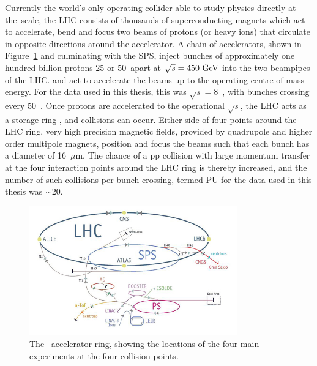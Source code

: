 Currently the world's only operating collider able to study physics directly at the~\TeV scale, the \ac{LHC} consists of thousands of superconducting magnets which act to accelerate, bend and focus two beams of protons (or heavy ions) that circulate in opposite directions around the accelerator. 
A chain of accelerators, shown in Figure~\ref{fig:LHC} and culminating with the \ac{SPS}, inject bunches of approximately one hundred billion protons 25 or 50~\ns apart at $\sqrt{s} = 450~\mathrm{GeV}$ into the two beampipes of the \ac{LHC}.
 and act to accelerate the beams up to the operating centre-of-mass energy. 
For the data used in this thesis, this was $\sqrt{s} = 8$~\TeV, 
with bunches crossing every 50~\ns.
Once protons are accelerated to the operational $\sqrt{s}$, the \ac{LHC} acts as a storage ring , and collisions can occur.
%
Either side of four points around the \ac{LHC} ring, very high precision magnetic fields, provided by quadrupole and higher order multipole magnets, position and focus the beams such that each bunch has a diameter of 16~$\mu$m. 
The chance of a pp collision with large momentum transfer at the four interaction points around the LHC ring is thereby increased, and the number of such collisions per bunch crossing, termed \ac{PU} for the data used in this thesis was $\sim20$.

\begin{figure}[htbp]
  \begin{center}
  \includegraphics[width=0.8\textwidth]{Figures/detector/lhc}
  \caption{The ~\LHC accelerator ring, showing the locations of the four main experiments at the four collision points.
}
  \label{fig:LHC}
  \end{center}
\end{figure}

